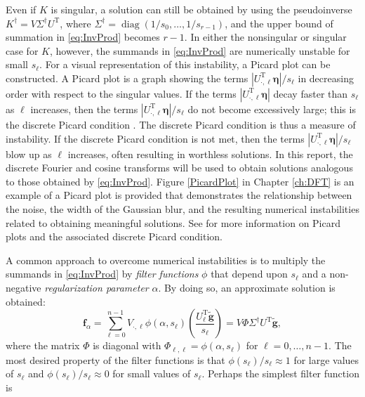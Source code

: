 \documentclass[12pt,notitlepage]{report}
\newcommand{\gnoiseVec}{\widetilde{\mathbf{g}}}	%
\newcommand{\kMat}{K}	%
\newcommand{\fVec}{\mathbf{f}}	%
\newcommand{\trans}{\mathrm{T}}	%
\DeclareMathOperator{\diag}{diag}	%
\newcommand{\regparam}{\alpha}
\newcommand{\filt}{\phi}
\newcommand{\noise}{\eta}	%
\newcommand{\noiseVec}{\bm{\noise}}	%
\newcommand{\singular}{s}	%
\begin{document}
Even if $\kMat$ is singular, a solution can still be obtained by using the pseudoinverse $\kMat^\dagger = V{\Sigma^\dagger}U^\trans$, where $\Sigma^\dagger = \diag(1/\singular_0,\ldots,1/\singular_{r-1})$, and the upper bound of summation in \eqref{eq:InvProd} becomes $r-1$. In either the nonsingular or singular case for $\kMat$, however, the summands in \eqref{eq:InvProd} are numerically unstable for small $\singular_\ell$. For a visual representation of this instability, a Picard plot can be constructed. A Picard plot is a graph showing the terms $|U^\trans_{\cdot,\ell}\noiseVec|/\singular_\ell$ in decreasing order with respect to the singular values. If the terms $|U^\trans_{\cdot,\ell}\noiseVec|$ decay faster than $\singular_\ell$ as $\ell$ increases, then the terms $|U^\trans_{\cdot,\ell}\noiseVec|/\singular_\ell$ do not become excessively large; this is the discrete Picard condition \cite{ABT}. The discrete Picard condition is thus a measure of instability. If the discrete Picard condition is not met, then the terms $|U^\trans_{\cdot,\ell}\noiseVec|/\singular_\ell$ blow up as $\ell$ increases, often resulting in worthless solutions. In this report, the discrete Fourier and cosine transforms will be used to obtain solutions analogous to those obtained by \eqref{eq:InvProd}. Figure \ref{PicardPlot} in Chapter \ref{ch:DFT} is an example of a Picard plot is provided that demonstrates the relationship between the noise, the width of the Gaussian blur, and the resulting numerical instabilities related to obtaining meaningful solutions. See \cite{Hansen1990} for more information on Picard plots and the associated discrete Picard condition. \par 
A common approach to overcome numerical instabilities is to multiply the summands in \eqref{eq:InvProd} by \textit{filter functions} $\filt$ that depend upon $\singular_\ell$ and a non-negative \textit{regularization parameter} $\regparam$. By doing so, an approximate solution is obtained:
\begin{equation}
\fVec_\regparam = \sum_{\ell = 0}^{n-1} V_{\cdot,\ell}\filt(\regparam,\singular_\ell)\left(\frac{{U^\trans_\ell}\gnoiseVec}{\singular_\ell}\right) = V\Phi\Sigma^\dagger U^\trans\gnoiseVec,
\label{eq:ApproxSol}
\end{equation}
where the matrix $\Phi$ is diagonal with $\Phi_{\ell,\ell} = \filt(\regparam,\singular_\ell)$ for $\ell = 0,\ldots,{n-1}$. The most desired property of the filter functions is that $\filt(\singular_\ell)/\singular_\ell \approx 1$  for large values of $\singular_\ell$ and $\filt(\singular_\ell)/\singular_\ell \approx 0$ for small values of $\singular_\ell$.  Perhaps the simplest filter function is
\end{document}
